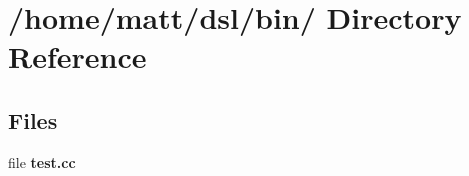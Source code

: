 \section{/home/matt/dsl/bin/ \-Directory \-Reference}
\label{dir_873dab66784bed25931c43d0999a2858}
\subsection*{\-Files}
\begin{DoxyCompactItemize}
\item 
file {\bf test.\-cc}
\end{DoxyCompactItemize}
